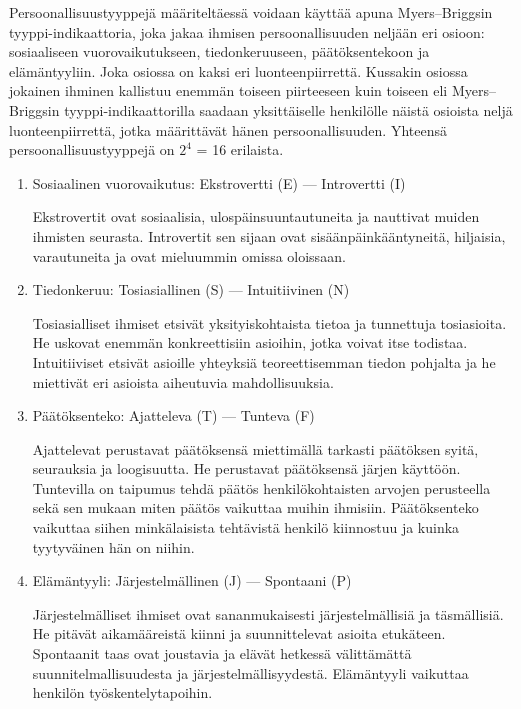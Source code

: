 \documentclass[finnish]{../tktltiki2}
\theoremstyle{definition}
\theoremstyle{remark}
\begin{document}
Persoonallisuustyyppejä määriteltäessä voidaan käyttää apuna
Myers--Briggsin tyyppi-indikaattoria, joka jakaa ihmisen persoonallisuuden neljään eri osioon: sosiaaliseen vuorovaikutukseen, tiedonkeruuseen, päätöksentekoon ja elämän\-tyyliin. Joka osiossa on
kaksi eri luonteenpiirrettä. Kussakin osiossa jokainen ihminen kallistuu enemmän toiseen piirteeseen kuin toiseen eli Myers--Briggsin
tyyppi-indikaattorilla saadaan yksittäiselle henkilölle näistä osioista neljä luonteenpiirrettä, jotka määrittävät hänen persoonallisuuden. Yhteensä
persoonallisuustyyppejä on $2^4$ = 16 erilaista.

\begin{enumerate}

\item Sosiaalinen vuorovaikutus: Ekstrovertti (E) --- Introvertti (I)

Ekstrovertit ovat sosiaalisia, ulospäinsuuntautuneita ja nauttivat
muiden ihmisten seurasta. Introvertit sen sijaan ovat sisäänpäinkääntyneitä, hiljaisia, varautuneita ja ovat mieluummin omissa oloissaan.

\item Tiedonkeruu: Tosiasiallinen (S) --- Intuitiivinen (N)

Tosiasialliset ihmiset etsivät yksityiskohtaista tietoa ja tunnettuja
tosiasioita. He uskovat enemmän konkreettisiin asioihin, jotka
voivat itse todistaa. Intuitiiviset etsivät asioille
yhteyksiä teoreettisemman tiedon pohjalta ja
he miettivät eri asioista aiheutuvia mahdollisuuksia.

\item Päätöksenteko: Ajatteleva (T) --- Tunteva (F)

Ajattelevat perustavat päätöksensä miettimällä tarkasti päätöksen syitä, seurauksia ja loogisuutta. He perustavat päätöksensä järjen käyttöön. Tuntevilla on taipumus tehdä päätös
henkilökohtaisten arvojen perusteella sekä sen mukaan miten päätös
vaikuttaa muihin ihmisiin. Päätöksenteko vaikuttaa siihen minkälaisista tehtävistä
henkilö kiinnostuu ja kuinka tyytyväinen hän on niihin.

\item Elämäntyyli: Järjestelmällinen (J) --- Spontaani (P)

Järjestelmälliset ihmiset ovat sananmukaisesti järjestelmällisiä
ja täsmäl\-lisiä. He pitävät aikamääreistä kiinni ja suunnittelevat
asioita etukäteen. Spontaanit taas ovat joustavia ja elävät
hetkessä välittämättä suunnitelmallisuudesta ja järjestelmällisyydestä.
Elämäntyyli vaikuttaa henkilön työskentelytapoihin.

\end{enumerate}
\end{document}
